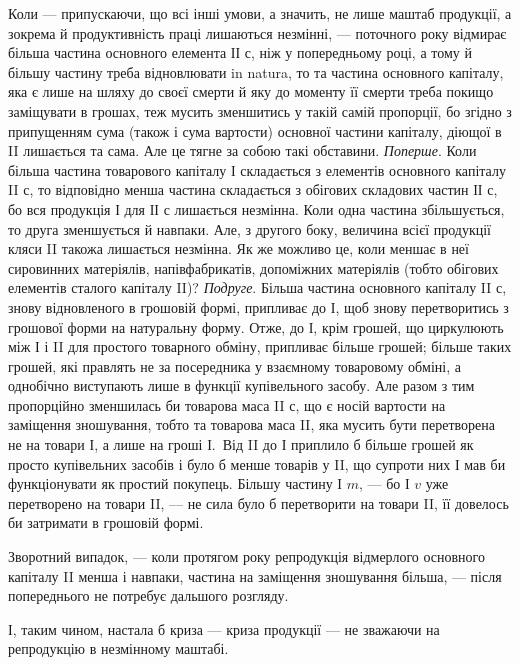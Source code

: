Коли — припускаючи, що всі інші умови, а значить, не лише маштаб
продукції, а зокрема й продуктивність праці лишаються незмінні, —
поточного року відмирає більша частина основного елемента ІІ $с$, ніж у
попередньому році, а тому й більшу частину треба відновлювати in
natura, то та частина основного капіталу, яка є лише на шляху до своєї
смерти й яку до моменту її смерти треба покищо заміщувати в грошах,
теж мусить зменшитись у такій самій пропорції, бо згідно з припущенням
сума (також і сума вартости) основної частини капіталу, діющої в II
лишається та сама. Але це тягне за собою такі обставини. \emph{Поперше}. Коли
більша частина товарового капіталу І складається з елементів основного
капіталу II $с$, то відповідно менша частина складається з обігових складових
частин ІІ $с$, бо вся продукція І для ІІ $с$ лишається незмінна. Коли одна
частина збільшується, то друга зменшується й навпаки. Але, з другого
боку, величина всієї продукції кляси II такожа лишається незмінна. Як
же можливо це, коли меншає в неї сировинних матеріялів, напівфабрикатів,
допоміжних матеріялів (тобто обігових елементів сталого капіталу II)?
\emph{Подруге}. Більша частина основного капіталу II $с$, знову відновленого в
грошовій формі, припливає до І, щоб знову перетворитись з грошової
форми на натуральну форму. Отже, до І, крім грошей, що циркулюють
між І і II для простого товарного обміну, припливає більше грошей;
більше таких грошей, які правлять не за посередника у взаємному товаровому
обміні, а однобічно виступають лише в функції купівельного
засобу. Але разом з тим пропорційно зменшилась би товарова маса
II $с$, що є носій вартости на заміщення зношування, тобто та товарова
маса II, яка мусить бути перетворена не на товари І, а лише на гроші І.~Від II до І приплило б більше грошей як просто купівельних засобів і
було б менше товарів у II, що супроти них І мав би функціонувати як
простий покупець. Більшу частину І $m$, — бо І $v$ уже перетворено на товари
II, — не сила було б перетворити на товари II, її довелось би затримати в
грошовій формі.

Зворотний випадок, — коли протягом року репродукція відмерлого
основного капіталу II менша і навпаки, частина на заміщення зношування
більша, — після попереднього не потребує дальшого розгляду.

І, таким чином, настала б криза — криза продукції — не зважаючи на
репродукцію в незмінному маштабі.
